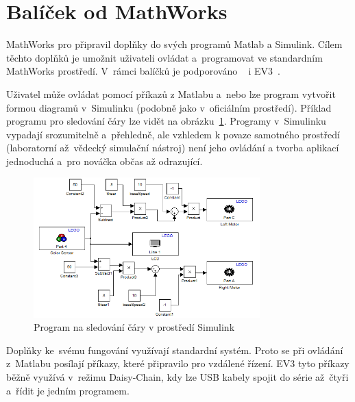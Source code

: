 \section{Balíček od MathWorks}
\label{lego-alternative-soft_mathworks}

MathWorks pro \legoM{} připravil doplňky do svých programů Matlab a Simulink. 
Cílem těchto doplňků je umožnit uživateli ovládat a~programovat \legoM{} ve standardním MathWorks prostředí. 
V~rámci balíčků je podporováno \legoNXT~\cite{legoProgramingPlatform_MathWork-NXT} i EV3~\cite{legoProgramingPlatform_MathWork-EV3}.

Uživatel může ovládat \brick{} pomocí příkazů z Matlabu a~nebo lze program vytvořit formou diagramů v~Simulinku (podobně jako v~oficiálním \lego{} prostředí). 
Příklad programu pro sledování čáry lze vidět na obrázku~\ref{fig:mathworks-simulink_line-tracking-model}.
Programy v~Simulinku vypadají srozumitelně a~přehledně, ale vzhledem k povaze samotného prostředí (laboratorní až~vědecký simulační nástroj) není jeho ovládání a tvorba aplikací jednoduchá a~pro nováčka občas až odrazující. 

\begin{figure}[h]
	\centering
	\includegraphics[width=330px]{images/mathworks-simulink_line-tracking-model.png}
	\caption[Program na sledování čáry v prostředí Simulink]{Program na sledování čáry v prostředí Simulink\protect\footnotemark}
	\label{fig:mathworks-simulink_line-tracking-model}
\end{figure}


Doplňky ke~svému fungování využívají standardní \lego{} systém. 
Proto se při ovládání  z~Matlabu posílají příkazy, které \lego{} připravilo pro vzdálené řízení. 
EV3 tyto příkazy běžně využívá v~režimu Daisy-Chain, kdy lze USB kabely spojit do série až~čtyři  a~řídit je jedním programem.     

